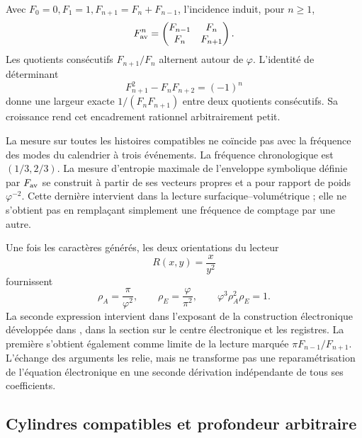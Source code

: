 Avec \(F_0=0,F_1=1,F_{n+1}=F_n+F_{n-1}\), l'incidence induit, pour \(n\geq1\),
\[
 F_{\rm av}^n=\begin{pmatrix}F_{n-1}&F_n\\F_n&F_{n+1}\end{pmatrix}.
\]
Les quotients consécutifs \(F_{n+1}/F_n\) alternent autour de \(\varphi\). L'identité de déterminant
\[
 F_{n+1}^2-F_nF_{n+2}=(-1)^n
\]
donne une largeur exacte \(1/(F_nF_{n+1})\) entre deux quotients consécutifs. Sa croissance rend cet encadrement rationnel arbitrairement petit.

La mesure sur toutes les histoires compatibles ne coïncide pas avec la fréquence des modes du calendrier à trois événements. La fréquence chronologique est \((1/3,2/3)\). La mesure d'entropie maximale de l'enveloppe symbolique définie par \(F_{\rm av}\) se construit à partir de ses vecteurs propres et a pour rapport de poids \(\varphi^{-2}\). Cette dernière intervient dans la lecture surfacique--volumétrique ; elle ne s'obtient pas en remplaçant simplement une fréquence de comptage par une autre.



Une fois les caractères générés, les deux orientations du lecteur
\[
 R(x,y)=\frac{x}{y^2}
\]
fournissent
\begin{equation}
 \rho_A=\frac\pi{\varphi^2},\qquad
 \rho_E=\frac\varphi{\pi^2},\qquad
 \varphi^3\rho_A^2\rho_E=1.
 \label{eq:areal-electron}
\end{equation}
La seconde expression intervient dans l’exposant de la construction électronique développée dans \cite{hmtX}, dans la section sur le centre électronique et les registres. La première s’obtient également comme limite de la lecture marquée \(\pi F_{n-1}/F_{n+1}\). L’échange des arguments les relie, mais ne transforme pas une reparamétrisation de l’équation électronique en une seconde dérivation indépendante de tous ses coefficients.



\subsection{Cylindres compatibles et profondeur arbitraire}

